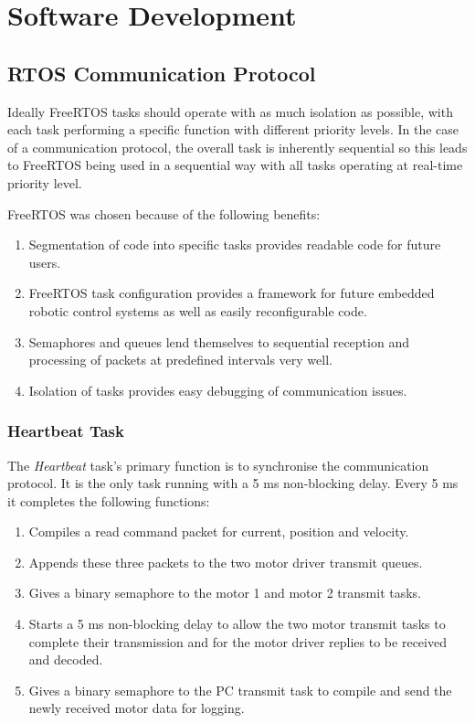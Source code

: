 \chapter{Software Development}
\section{RTOS Communication Protocol}

Ideally FreeRTOS tasks should operate with as much isolation as possible, with each task performing a specific function with different priority levels. In the case of a communication protocol, the overall task is inherently sequential so this leads to FreeRTOS being used in a sequential way with all tasks operating at real-time priority level. 

FreeRTOS was chosen because of the following benefits:

\begin{enumerate}
\item Segmentation of code into specific tasks provides readable code for future users.
\item FreeRTOS task configuration provides a framework for future embedded robotic control systems as well as easily reconfigurable code.
\item Semaphores and queues lend themselves to sequential reception and processing of packets at predefined intervals very well.
\item Isolation of tasks provides easy debugging of communication issues.
\end{enumerate}

\subsection{Heartbeat Task}
The \textit{Heartbeat} task's primary function is to synchronise the communication protocol. It is the only task running with a 5 ms non-blocking delay. Every 5 ms it completes the following functions:

\begin{enumerate}
\item Compiles a read command packet for current, position and velocity.
\item Appends these three packets to the two motor driver transmit queues. 
\item Gives a binary semaphore to the motor 1 and motor 2 transmit tasks.
\item Starts a 5 ms non-blocking delay to allow the two motor transmit tasks to complete their transmission and for the motor driver replies to be received and decoded.
\item Gives a binary semaphore to the PC transmit task to compile and send the newly received motor data for logging.
\end{enumerate}

